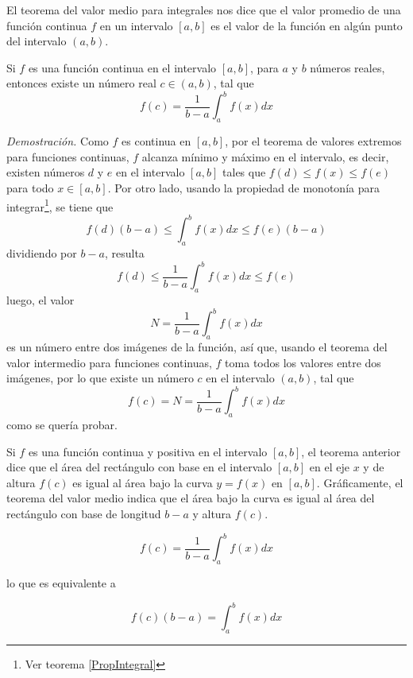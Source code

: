 El teorema del valor medio para integrales nos dice que el valor promedio de una función continua $f$ en un intervalo $[a,b]$ es el valor de la función en algún punto del intervalo $(a,b)$.
\begin{teorema}\label{ValorMedio}
\textnormal{Si \textit{$f$} es una función continua en el intervalo \textit{$\left[a,b\right]$}, para \textit{$a$} y \textit{$b$} números reales, entonces existe un número real \textit{$c\in \left( a,b\right)$}, tal que}
\begin{equation}
f\left( c\right) =\frac{1}{b-a}\int_{a}^{b}f(x)dx
\end{equation}

\end{teorema}
\textit{Demostración.} Como $f$ es continua en $[a,b]$, por el teorema de valores extremos para funciones continuas\textcite{Zill_Wright_2011}, $f$ alcanza mínimo y máximo en el intervalo, es decir, existen números $d$ y $e$ en el intervalo $[a,b]$ tales que $f\left(d\right) \leq f(x)\leq f(e)$ para todo $x\in[a,b]$. Por otro lado, usando la propiedad de monotonía para integrar\footnote{Ver teorema \ref{PropIntegral}}, se tiene que
 \[
 f(d)(b-a)\leq \int_{a}^{b}f(x)dx\leq f(e)(b-a)
 \]
dividiendo por $b-a$, resulta
\[
f\left( d\right) \leq \frac{1}{b-a}\int_{a}^{b}f(x)dx\leq f(e)
\]
luego, el valor
\[
N=\frac{1}{b-a}\int_{a}^{b}f(x)dx
\]
es un número entre dos imágenes de la función, así que, usando el teorema del valor intermedio para funciones continuas\textcite{Zill_Wright_2011}, $f$ toma todos los valores entre dos imágenes, por lo que existe un número $c$ en el intervalo $\left( a,b\right)$, tal que
\[
f(c)=N=\frac{1}{b-a}\int_{a}^{b}f(x)dx
\]
como se quería probar. 

Si $f$ es una función continua y positiva en el intervalo $\left[a,b\right] $, el teorema anterior dice que el área del rectángulo con base en el intervalo $\left[ a,b\right] $ en el eje $x$ y de altura $
f\left( c\right) $ es igual al área bajo la curva $y=f\left( x\right) $ en $\left[ a,b\right] .$ Gráficamente, el teorema del valor medio indica que el área bajo la curva es igual al área del rectángulo con base de longitud $b-a$ y altura $f\left( c\right).$

{\small
\[
f\left( c\right) =\frac{1}{b-a}\int_{a}^{b}f(x)dx
\]
}

lo que es equivalente a

{\small
\[
f\left( c\right) \left( b-a\right) =\int_{a}^{b}f(x)dx
\]
}

%


